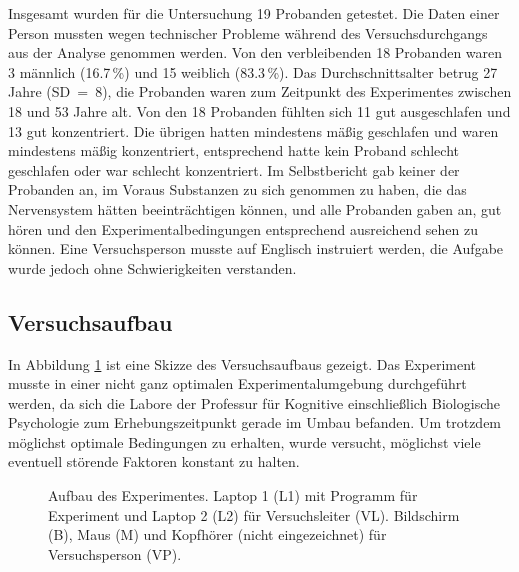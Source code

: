\documentclass[doc,a4paper,12pt]{apa6}
\begin{document}
Insgesamt wurden für die Untersuchung 19 Probanden getestet. Die Daten einer Person mussten wegen technischer Probleme während des Versuchsdurchgangs aus der Analyse genommen werden. Von den verbleibenden 18 Probanden waren 3 männlich (16.7\,\%) und 15 weiblich (83.3\,\%). Das Durchschnittsalter betrug 27 Jahre (SD~=~8), die Probanden waren zum Zeitpunkt des Experimentes zwischen 18 und 53 Jahre alt. Von den 18 Probanden fühlten sich 11 gut ausgeschlafen und 13 gut konzentriert. Die übrigen hatten mindestens mäßig geschlafen und waren mindestens mäßig konzentriert, entsprechend hatte kein Proband schlecht geschlafen oder war schlecht konzentriert. Im Selbstbericht gab keiner der Probanden an, im Voraus Substanzen zu sich genommen zu haben, die das Nervensystem hätten beeinträchtigen können, und alle Probanden gaben an, gut hören und den Experimentalbedingungen entsprechend ausreichend sehen zu können. Eine Versuchsperson musste auf Englisch instruiert werden, die Aufgabe wurde jedoch ohne Schwierigkeiten verstanden.

\subsection{Versuchsaufbau}

In Abbildung \ref{experiment} ist eine Skizze des Versuchsaufbaus gezeigt. Das Experiment musste in einer nicht ganz optimalen Experimentalumgebung durchgeführt werden, da sich die Labore der Professur für Kognitive einschließlich Biologische Psychologie zum Erhebungszeitpunkt gerade im Umbau befanden. Um trotzdem möglichst optimale Bedingungen zu erhalten, wurde versucht, möglichst viele eventuell störende Faktoren konstant zu halten.

\begin{figure}
  \centering
  \begin{minipage}{.55\textwidth}
    \setlength{\fboxsep}{.05\textwidth}
    \vspace{10pt}
    \caption{Aufbau des Experimentes. Laptop 1 (L1) mit Programm für Experiment und Laptop 2 (L2) für Versuchsleiter (VL). Bildschirm (B), Maus (M) und Kopfhörer (nicht eingezeichnet) für Versuchsperson (VP).}
    \label{experiment}
  \end{minipage}
\end{figure}
\end{document}
